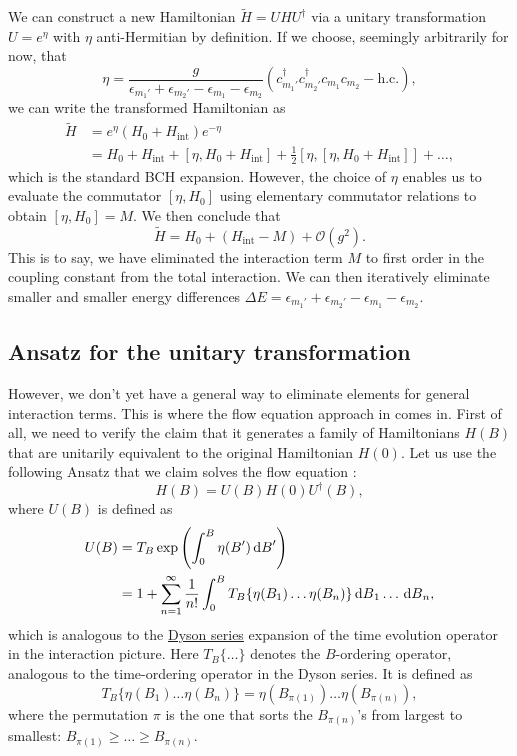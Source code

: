 \documentclass{article}
\begin{document}
We can construct a new Hamiltonian $\tilde{H}=UHU^{\dagger}$ via a unitary transformation $U=e^{\eta}$ with $\eta$ anti-Hermitian by definition. If we choose, seemingly arbitrarily for now, that
\begin{equation}
\eta=\frac{g}{\epsilon_{m_1'}+\epsilon_{m_2'}-\epsilon_{m_1}-\epsilon_{m_2}}(c^{\dagger}_{m_1'}c^{\dagger}_{m_2'}c_{m_1}c_{m_2}-\mathrm{h.c.}),
\end{equation}
we can write the transformed Hamiltonian as
\begin{align}
\tilde{H}&=e^{\eta}(H_0+H_{\mathrm{int}})e^{-\eta}\\
&=H_0+H_{\mathrm{int}}+[\eta,H_0+H_{\mathrm{int}}]+\frac{1}{2}[\eta,[\eta,H_0+H_{\mathrm{int}}]]+\dots,
\end{align}
which is the standard BCH expansion. However, the choice of $\eta$ enables us to evaluate the commutator $[\eta,H_0]$ using elementary commutator relations to obtain $[\eta,H_0]=M$. We then conclude that
\begin{equation}
\tilde{H}=H_0+(H_{\mathrm{int}}-M)+\mathcal{O}(g^2).
\end{equation}
This is to say, we have eliminated the interaction term $M$ to first order in the coupling constant from the total interaction. We can then iteratively eliminate smaller and smaller energy differences $\Delta E=\epsilon_{m_1'}+\epsilon_{m_2'}-\epsilon_{m_1}-\epsilon_{m_2}$.

\subsection{Ansatz for the unitary transformation}
However, we don't yet have a general way to eliminate elements for general interaction terms. This is where the flow equation approach in  comes in. First of all, we need to verify the claim that it generates a family of Hamiltonians $H(B)$ that are unitarily equivalent to the original Hamiltonian $H(0)$. Let us use the following Ansatz that we claim solves the flow equation :
\begin{equation}
H(B)=U(B)H(0)U^{\dagger}(B),
\end{equation}
where $U(B)$ is defined as
\begin{align}
U(B)&=T_B\exp\left(\int_0^B\eta(B')\dl B'\right)\label{eq:ubdef}\\
&=1+\sum_{n=1}^{\infty}\frac{1}{n!}\int_0^BT_B\{ \eta(B_1)\dots\eta(B_n) \}\dl B_1\dots\dl B_n,
\end{align}
which is analogous to the \href{https://en.wikipedia.org/wiki/Dyson_series}{Dyson series} expansion of the time evolution operator in the interaction picture. Here $T_B\{\dots\}$ denotes the $B$-ordering operator, analogous to the time-ordering operator in the Dyson series. It is defined as
\begin{equation}
T_B\{ \eta(B_1)\dots\eta(B_n) \}=\eta(B_{\pi(1)})\dots\eta(B_{\pi(n)}),
\end{equation}
where the permutation $\pi$ is the one that sorts the $B_{\pi(n)}$'s from largest to smallest: $B_{\pi(1)}\geq\dots\geq B_{\pi(n)}$.
\end{document}
